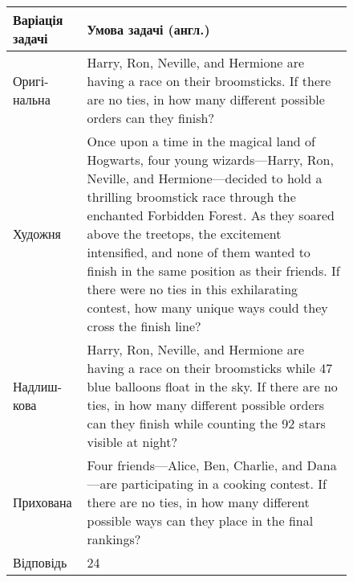 \begin{figure}[h!]
\centering
\small
{}
\label{tab:problem_example_2144}
\begin{tabular}{|p{2cm}|p{14cm}|}
    \hline
    \textbf{Варіація задачі} & \textbf{Умова задачі (англ.)} \\
    \hline
    Оригі-нальна & Harry, Ron, Neville, and Hermione are having a race on their broomsticks. If there are no ties, in how many different possible orders can they finish? \\ \hline
    Художня & Once upon a time in the magical land of Hogwarts, four young wizards—Harry, Ron, Neville, and Hermione—decided to hold a thrilling broomstick race through the enchanted Forbidden Forest. As they soared above the treetops, the excitement intensified, and none of them wanted to finish in the same position as their friends. If there were no ties in this exhilarating contest, how many unique ways could they cross the finish line? \\ \hline
    Надлиш-кова & Harry, Ron, Neville, and Hermione are having a race on their broomsticks while 47 blue balloons float in the sky. If there are no ties, in how many different possible orders can they finish while counting the 92 stars visible at night? \\ \hline
    Прихована & Four friends—Alice, Ben, Charlie, and Dana—are participating in a cooking contest. If there are no ties, in how many different possible ways can they place in the final rankings? \\ \hline
    Відповідь & 24 \\ \hline
\end{tabular}
\end{figure}

